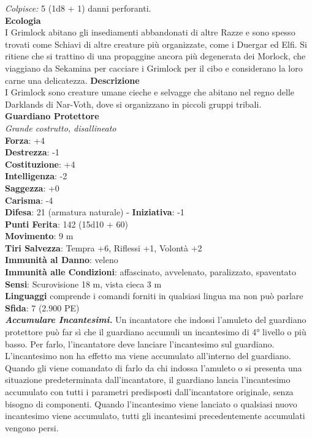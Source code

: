 \begin{multicols}{2}
\emph{Colpisce:} 5 (1d8 + 1) danni perforanti.\\
\textbf{Ecologia}\\
I Grimlock abitano gli insediamenti abbandonati di altre Razze e sono spesso trovati come Schiavi di altre creature più organizzate, come i Duergar ed Elfi. Si ritiene che si trattino di una propaggine ancora più degenerata dei Morlock, che viaggiano da Sekamina per cacciare i Grimlock per il cibo e considerano la loro carne una delicatezza.
\textbf{Descrizione}\\
I Grimlock sono creature umane cieche e selvagge che abitano nel regno delle Darklands di Nar-Voth, dove si organizzano in piccoli gruppi tribali.\\

\medskip\textbf{Guardiano Protettore}\\
\emph{Grande costrutto, disallineato}\\
\textbf{Forza}: +4\\
\textbf{Destrezza}: -1\\
\textbf{Costituzione}: +4\\
\textbf{Intelligenza}: -2\\
\textbf{Saggezza}: +0\\
\textbf{Carisma}: -4\\
\textbf{Difesa}: 21 (armatura naturale) - \textbf{Iniziativa}: -1\\
\textbf{Punti Ferita}: 142 (15d10 + 60)\\
\textbf{Movimento}: 9 m\\
\textbf{Tiri Salvezza}: Tempra +6, Riflessi +1, Volontà +2\\
\textbf{Immunità al Danno}: veleno\\
\textbf{Immunità alle Condizioni}: affascinato, avvelenato, paralizzato, spaventato\\
\textbf{Sensi}: Scurovisione 18 m, vista cieca 3 m \\
\textbf{Linguaggi} comprende i comandi forniti in qualsiasi lingua ma non può parlare\\
\textbf{Sfida}: 7 (2.900 PE)\smallskip\\
\emph{\textbf{Accumulare Incantesimi.}} Un incantatore che indossi l'amuleto del guardiano protettore può far sì che il guardiano accumuli un incantesimo di 4° livello o più basso. Per farlo, l'incantatore deve lanciare l'incantesimo sul guardiano. L'incantesimo non ha effetto ma viene accumulato all'interno del guardiano. Quando gli viene comandato di farlo da chi indossa l'amuleto o si presenta una situazione predeterminata dall'incantatore, il guardiano lancia l'incantesimo accumulato con tutti i parametri predisposti dall'incantatore originale, senza bisogno di componenti. Quando l'incantesimo viene lanciato o qualsiasi nuovo incantesimo viene accumulato, tutti gli incantesimi precedentemente accumulati vengono persi.\\

\end{multicols}
